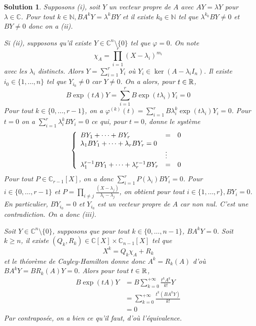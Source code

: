 \documentclass[12pt]{article}
\newtheorem{solution}{Solution}[section]
\theoremstyle{remark}
\newcommand{\C}{\mathbb{C}} \newcommand{\Q}{\mathbb{Q}}
\newcommand{\N}{\mathbb{N}} \newcommand{\Z}{\mathbb{Z}}
\numberwithin{equation}{section}
\begin{document}
\begin{solution}
	Supposons (i), soit $Y$ un vecteur propre de $A$ avec $AY=\lambda Y$ pour $\lambda\in\C$. Pour tout $k\in\N,BA^{k}Y=\lambda^{k}BY$ et il existe $k_{0}\in\N$ tel que $\lambda^{k_{0}}BY\neq0$ et $BY\neq0$ donc on a (ii).

	Si (ii), supposons qu'il existe $Y\in\C^{n}\setminus\{0\}$ tel que $\varphi=0$. On note 
	$$\chi_{A}=\prod_{i=1}^{r}(X-\lambda_{i})^{m_{i}}$$ avec les $\lambda_{i}$ distincts. Alors $Y=\sum_{i=1}^{r}Y_{i}$ où $Y_{i}\in\ker(A-\lambda_{i}I_{n})$. Il existe $i_{0}\in\{1,\dots,n\}$ tel que $Y_{i_{0}}\neq0$ car $Y\neq0$. On a alors, pour $t\in\mathbb{R}$,
	$$B\exp(tA)Y=\sum_{i=1}^{r}B\exp(t\lambda_{i})Y_{i}=0$$
	Pour tout $k\in\{0,\dots,r-1\}$, on a $\varphi^{(k)}(t)=\sum_{i=1}^{r}B\lambda_{i}^{k}\exp(t\lambda_{i})Y_{i}=0$. Pour $t=0$ on a $\sum_{i=1}^{r}\lambda_{i}^{k}BY_{i}=0$ ce qui, pour $t=0$, donne le système 
	$$
	\left\{
		\begin{array}[]{lll}
			BY_{1}+\dots+BY_{r} &= &0\\
			\lambda_{1}BY_{1}+\dots+\lambda_{r}BY_{r}=0\\
			&\vdots&\\
			\lambda_{1}^{r-1}BY_{1}+\dots+\lambda_{r}^{r-1}BY_{r} &= &0
		\end{array}
	\right.
	$$
	Pour tout $P\in\C_{r-1}[X]$, on a donc $\sum_{i=1}^{r}P(\lambda_{i})BY_{i}=0$. Pour $i\in\{0,\dots,r-1\}$ et $P=\prod_{i\neq j}\frac{(X-\lambda_{j})}{\lambda_{i}-\lambda_{j}}$, on obtient pour tout $i\in\{1,\dots, r\}, BY_{i}=0$. En particulier, $BY_{i_{0}}=0$ et $Y_{i_{0}}$ est un vecteur propre de $A$ car non nul. C'est une contradiction. On a donc (iii).

	\item Soit $Y\in\C^{n}\setminus\{0\}$, supposons que pour tout $k\in\{0,\dots,n-1\}$, $BA^{k}Y=0$. Soit $k\geqslant n$, il existe $(Q_{k},R_{k})\in\C[X]\times\C_{n-1}[X]$ tel que 
	$$X^{k}=Q_{k}\chi_{A}+R_{k}$$
	et le théorème de Cayley-Hamilton donne donc $A^{k}=R_{k}(A)$ d'où $BA^{k}Y=BR_{k}(A)Y=0$. Alors pour tout $t\in\mathbb{R}$,
	\begin{align*}
		B\exp(tA)Y
		&=B\sum_{k=0}^{+\infty}\frac{t^{k}A^{k}}{k!}Y\\
		&=\sum_{k=0}^{+\infty}\frac{t^{k}(BA^{k}Y)}{k!}\\
		&=0
	\end{align*}
	Par contraposée, on a bien ce qu'il faut, d'où l'équivalence.
\end{solution}

\cleardoublepage
\end{document}

